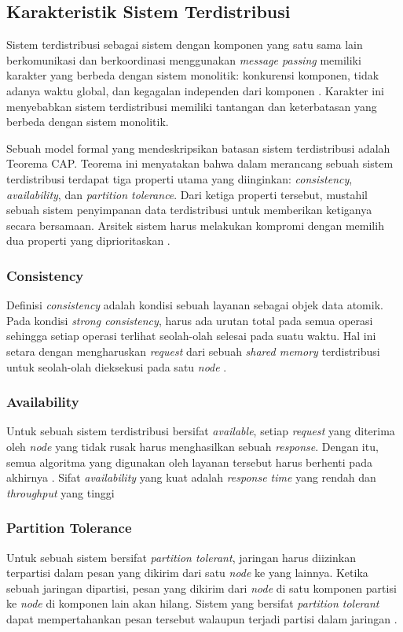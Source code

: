 \subsection{Karakteristik Sistem Terdistribusi}

Sistem terdistribusi sebagai sistem dengan komponen yang satu sama lain berkomunikasi dan berkoordinasi menggunakan \textit{message passing} memiliki karakter yang berbeda dengan sistem monolitik: konkurensi komponen, tidak adanya waktu global, dan kegagalan independen dari komponen \parencite{coulouris2012distributed}. Karakter ini menyebabkan sistem terdistribusi memiliki tantangan dan keterbatasan yang berbeda dengan sistem monolitik.

Sebuah model formal yang mendeskripsikan batasan sistem terdistribusi adalah Teorema CAP. Teorema ini menyatakan bahwa dalam merancang sebuah sistem terdistribusi terdapat tiga properti utama yang diinginkan: \textit{consistency}, \textit{availability}, dan \textit{partition tolerance}. Dari ketiga properti tersebut, mustahil sebuah sistem penyimpanan data terdistribusi untuk memberikan ketiganya secara bersamaan. Arsitek sistem harus melakukan kompromi dengan memilih dua properti yang diprioritaskan \parencite{gilbert2002brewer}.

\subsubsection{Consistency}

Definisi \textit{consistency} adalah kondisi sebuah layanan sebagai objek data atomik. Pada kondisi \textit{strong consistency}, harus ada urutan total pada semua operasi sehingga setiap operasi terlihat seolah-olah selesai pada suatu waktu. Hal ini setara dengan mengharuskan \textit{request} dari sebuah \textit{shared memory} terdistribusi untuk seolah-olah dieksekusi pada satu \textit{node} \parencite{gilbert2002brewer}.

\subsubsection{Availability}

Untuk sebuah sistem terdistribusi bersifat \textit{available}, setiap \textit{request} yang diterima oleh \textit{node} yang tidak rusak harus menghasilkan sebuah \textit{response}. Dengan itu, semua algoritma yang digunakan oleh layanan tersebut harus berhenti pada akhirnya \parencite{gilbert2002brewer}. Sifat \textit{availability} yang kuat adalah \textit{response time} yang rendah dan \textit{throughput} yang tinggi

\subsubsection{Partition Tolerance}

Untuk sebuah sistem bersifat \textit{partition tolerant}, jaringan harus diizinkan terpartisi dalam pesan yang dikirim dari satu \textit{node} ke yang lainnya. Ketika sebuah jaringan dipartisi, pesan yang dikirim dari \textit{node} di satu komponen partisi ke \textit{node} di komponen lain akan hilang. Sistem yang bersifat \textit{partition tolerant} dapat mempertahankan pesan tersebut walaupun terjadi partisi dalam jaringan \parencite{gilbert2002brewer}.
